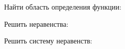 \begin{enumcols}[label=\arabf]
	\item Найти область определения функции:
	\begin{enumcols}[itemcolumns=2]
		\item {}
		\item {}
		\item {}
	\end{enumcols}
	\item Решить неравенства:
	\begin{enumcols}[itemcolumns=3]
		\item {}
		\item {}
		\item {}
		\item {}
		\item {}
	\end{enumcols}
	\item Решить систему неравенств:
	\begin{enumcols}[itemcolumns=2]
		\item {}
		\item {}
		\item {}
		\item {}
	\end{enumcols}
\end{enumcols}